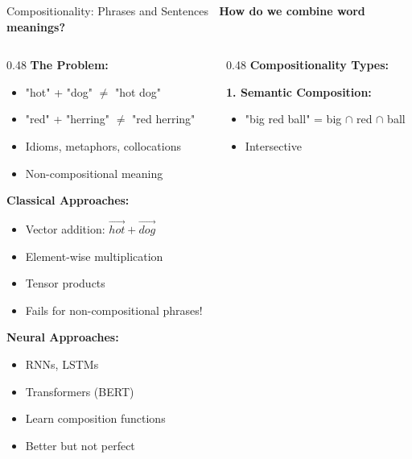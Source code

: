 \documentclass[aspectratio=169]{beamer}
\begin{document}
\begin{frame}[shrink=10]{Compositionality: Phrases and Sentences 🧩}
\textbf{How do we combine word meanings?}

\vspace{1em}

\begin{columns}[T]
\begin{column}{0.48\textwidth}
\textbf{The Problem:}
\begin{itemize}\setlength{\itemsep}{0pt}
    \item "hot" + "dog" $\neq$ "hot dog"
    \item "red" + "herring" $\neq$ "red herring"
    \item Idioms, metaphors, collocations
    \item Non-compositional meaning
\end{itemize}

\vspace{0.5em}
\textbf{Classical Approaches:}
\begin{itemize}\setlength{\itemsep}{0pt}
    \item Vector addition: $\vec{hot} + \vec{dog}$
    \item Element-wise multiplication
    \item Tensor products
    \item Fails for non-compositional phrases!
\end{itemize}

\vspace{0.5em}
\textbf{Neural Approaches:}
\begin{itemize}\setlength{\itemsep}{0pt}
    \item RNNs, LSTMs
    \item Transformers (BERT)
    \item Learn composition functions
    \item Better but not perfect
\end{itemize}
\end{column}

\begin{column}{0.48\textwidth}
\textbf{Compositionality Types:}

\vspace{0.3em}
\textbf{1. Semantic Composition:}
\begin{itemize}\setlength{\itemsep}{0pt}
    \item "big red ball" = big $\cap$ red $\cap$ ball
    \item Intersective
\end{itemize}


\end{column}
\end{columns}
\end{frame}
\end{document}
